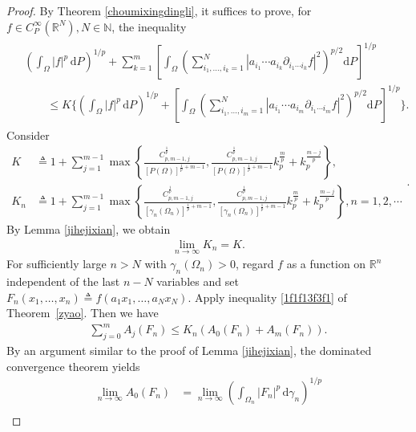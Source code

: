 \documentclass[12pt]{article}
\theoremstyle{plain}
\theoremstyle{definition}
\theoremstyle{remark}
\numberwithin{equation}{section}
\newcommand{\rr}{\mathbb{R}}
\begin{document}
\begin{proof}
By Theorem \ref{choumixingdingli}, it suffices to prove, for $f\in C_{P}^{\infty}\left( \mathbb{R}^{N} \right) ,N\in \mathbb{N}$, the inequality
\begin{eqnarray}\label{1ff313g}
\begin{aligned}
&\left(\int_{\Omega}|f|^p\,\mathrm dP\right)^{1/p}
+\sum_{k=1}^{m}
\left[
\int_{\Omega}
\left(
\sum_{i_1,\ldots,i_k=1}^{N}
\left|a_{i_1}\cdots a_{i_k}\partial_{i_1\cdots i_k}f\right|^2
\right)^{p/2}\mathrm dP
\right]^{1/p}
\\
&\qquad\leqslant
K\Bigg\{
\left(\int_{\Omega}|f|^p\,\mathrm dP\right)^{1/p}
+
\left[
\int_{\Omega}
\left(
\sum_{i_1,\ldots,i_m=1}^{N}
\left|a_{i_1}\cdots a_{i_m}\partial_{i_1\cdots i_m}f\right|^2
\right)^{p/2}\mathrm dP
\right]^{1/p}
\Bigg\}.
\end{aligned}
\end{eqnarray}
Consider
$$\begin{aligned}K&\triangleq 1+\sum_{j=1}^{m-1} \max \left\{ \frac{C_{p,m-1,j}^{\frac{1}{p}}}{[P(\Omega)]^{\frac{1}{p}+m-1}} ,\frac{C_{p,m-1,j}^{\frac{1}{p}}}{[P(\Omega)]^{\frac{1}{p}+m-1}} k_{p}^{\frac{m}{p}}+k_{p}^{\frac{m-j}{p}} \right\} ,\\ K_{n}&\triangleq 1+\sum_{j=1}^{m-1} \max \left\{ \frac{C_{p,m-1,j}^{\frac{1}{p}}}{[\gamma_n(\Omega_n)]^{\frac{1}{p}+m-1}} ,\frac{C_{p,m-1,j}^{\frac{1}{p}}}{[\gamma_n(\Omega_n)]^{\frac{1}{p}+m-1}} k_{p}^{\frac{m}{p}}+k_{p}^{\frac{m-j}{p}} \right\} ,n=1,2,\cdots\end{aligned} .$$
By Lemma \ref{jihejixian}, we obtain
\begin{eqnarray}
	\lim_{n\rightarrow \infty} K_{n}=K.\label{1f3ggg}
\end{eqnarray}
For sufficiently large $n>N$ with $\gamma_n(\Omega_n)>0$, regard $f$ as a function on $\rr^n$ independent of the last $n-N$ variables and set $F_n(x_1,\ldots,x_n)\triangleq f(a_1x_1,\ldots,a_Nx_N)$.  Apply inequality \eqref{1f1f13f3f1} of Theorem~\ref{zyao}. Then we have
\begin{eqnarray}
	\sum_{j=0}^{m} A_{j}\left( F_n \right) \leqslant K_{n}\left( A_{0}\left( F_n \right) +A_{m}\left( F_n \right) \right).\label{1f31f1f13}
\end{eqnarray}
By an argument similar to the proof of Lemma \ref{jihejixian}, the dominated convergence theorem yields
\[
\begin{aligned}
\lim_{n\to\infty}A_0(F_n)
&=\lim_{n\to\infty}
\left(\int_{\Omega_n}|F_n|^p\,\mathrm d\gamma_n\right)^{1/p}\\

\end{aligned}\]
\end{proof}
\end{document}
